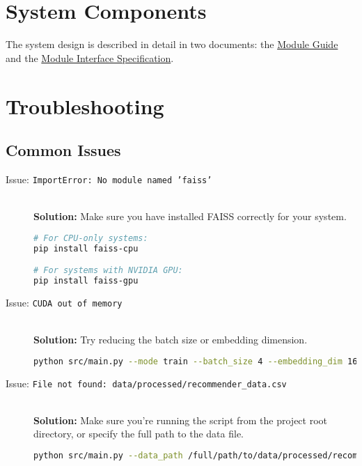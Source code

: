 \documentclass[12pt, a4paper, oneside]{book}
\begin{document}
\chapter{System Components}

The system design is described in detail in two documents: the \href{https://github.com/V-AS/Two-tower-recommender-system/blob/main/docs/Design/SoftArchitecture/MG.pdf}{Module Guide} and the \href{https://github.com/V-AS/Two-tower-recommender-system/blob/main/docs/Design/SoftDetailedDes/MIS.pdf}{Module Interface Specification}.

\chapter{Troubleshooting}

\section{Common Issues}
\begin{description}
    \item[Issue: \texttt{ImportError: No module named 'faiss'}]\ \\
    \textbf{Solution:} Make sure you have installed FAISS correctly for your system.
    \begin{lstlisting}[language=bash]
# For CPU-only systems:
pip install faiss-cpu

# For systems with NVIDIA GPU:
pip install faiss-gpu
    \end{lstlisting}

    \item[Issue: \texttt{CUDA out of memory}]\ \\
    \textbf{Solution:} Try reducing the batch size or embedding dimension.
    \begin{lstlisting}[language=bash]
python src/main.py --mode train --batch_size 4 --embedding_dim 16
    \end{lstlisting}

    \item[Issue: \texttt{File not found: data/processed/recommender\_data.csv}]\ \\
    \textbf{Solution:} Make sure you're running the script from the project root directory, or specify the full path to the data file.
    \begin{lstlisting}[language=bash]
python src/main.py --data_path /full/path/to/data/processed/recommender_data.csv
    \end{lstlisting}

\end{description}
\end{document}
